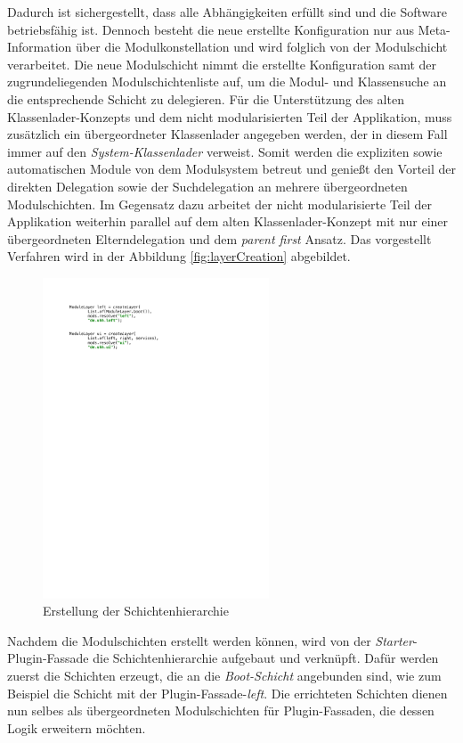 	Dadurch ist sichergestellt, dass alle Abhängigkeiten erfüllt sind und die Software betriebsfähig ist. Dennoch besteht die neue erstellte Konfiguration nur aus Meta-Information über die Modulkonstellation und wird folglich von der Modulschicht verarbeitet. Die neue Modulschicht nimmt die erstellte Konfiguration samt der zugrundeliegenden Modulschichtenliste auf, um die Modul- und Klassensuche an die entsprechende Schicht zu delegieren. Für die Unterstützung des alten Klassenlader-Konzepts und dem nicht modularisierten Teil der Applikation, muss zusätzlich ein übergeordneter Klassenlader angegeben werden, der in diesem Fall immer auf den \textit{System-Klassenlader} verweist. Somit werden die expliziten sowie automatischen Module von dem Modulsystem betreut und genießt den Vorteil der direkten Delegation sowie der Suchdelegation an mehrere übergeordneten Modulschichten. Im Gegensatz dazu arbeitet der nicht modularisierte Teil der Applikation weiterhin parallel auf dem alten Klassenlader-Konzept mit nur einer übergeordneten Elterndelegation und dem \textit{parent first} Ansatz. Das vorgestellt Verfahren wird in der Abbildung \ref{fig:layerCreation} abgebildet.\bigbreak
	\begin{figure}[h!]
		   \centering
		   \captionsetup{justification=centering}
		   \includegraphics[width=0.6\textwidth]{material/images/umsetzung/left.pdf}
		   \caption{Erstellung der Schichtenhierarchie}
		   \label{fig:createlayer}
	\end{figure}
	Nachdem die Modulschichten erstellt werden können, wird von der \textit{Starter}-Plugin-Fassade die Schichtenhierarchie aufgebaut und verknüpft. Dafür werden zuerst die Schichten erzeugt, die an die \textit{Boot-Schicht} angebunden sind, wie zum Beispiel die Schicht mit der Plugin-Fassade-\textit{left}. Die errichteten Schichten dienen nun selbes als übergeordneten Modulschichten für Plugin-Fassaden, die dessen Logik erweitern möchten. \newline
